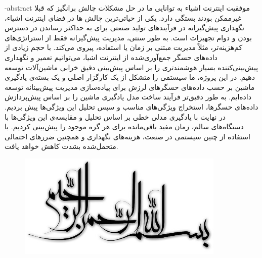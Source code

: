 
\fa-abstract{
موفقیت اینترنت اشیاء به توانایی ما در حل مشکلات چالش برانگیز که قبلا غیرممکن بودند بستگی دارد. یکی از حیاتی‌ترین چالش ها در فضای اینترنت اشیاء، نگهداری پیش‌گیرانه در فرآیندهای تولید صنعتی برای به حداکثر رساندن در دسترس بودن و دوام تجهیزات است. به طور سنتی، مدیریت پیش‌گیرانه فقط از استراتژی‌های کم‌هزینه‌تر، مثلاً مدیریت مبتنی بر زمان یا استفاده، پیروی می‌کند. با حجم زیادی از داده‌های حسگر جمع‌آوری‌شده از اینترنت اشیا، می‌توانیم تعمیر و نگهداری پیش‌بینی‌کننده بسیار هوشمندتری را بر اساس پیش‌بینی دقیق خرابی ماشین‌آلات توسعه دهیم. در این پروژه، ما سیستمی را متشکل از یک کارگزار اصلی و یک بسته‌ی یادگیری ماشین بر حسب داده‌های حسگرهای لرزش برای پیاده‌سازی مدیریت پیش‌بینانه توسعه داده‌ایم. به طور دقیق‌تر فرآیند ساخت مدل یادگیری ماشین را بر اساس پیش‌پردازش داده‌های حسگرها، استخراج ویژگی‌های مناسب و سپس تحلیل این ویژگی‌ها پیش‌ بردیم. در نهایت با یادگیری مدلی خطی بر اساس تحلیل و مقایسه‌ی این ویژگی‌ها با دستگاه‌های سالم، زمان مفید باقی‌مانده برای هر گره موجود را پیش‌بینی کردیم. با استفاده از چنین سیستمی در صنعت، هزینه‌های نگهداری و همچنین ضررهای احتمالی متحمل‌شده بشدت کاهش خواهد یافت.
}





\AUTtitle
\vspace*{7cm}
\thispagestyle{empty}
\begin{center}
\includegraphics[height=5cm,width=12cm]{besm}
\end{center}